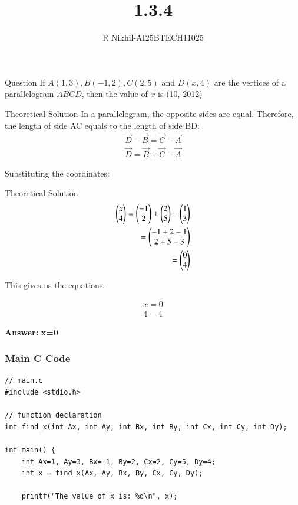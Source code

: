 \documentclass{beamer}
\title %
{1.3.4}
\author %
{R Nikhil-AI25BTECH11025}
\begin{document}
\frame{\titlepage}
\begin{frame}{Question}
If $ A(1, 3), B(-1, 2), C(2, 5) $ and $ D(x, 4) $ are the vertices of a parallelogram \( ABCD \), then the value of $x$ is \underline{\hspace{2cm}}(10, 2012)
\end{frame}

\begin{frame}{Theoretical Solution}
In a parallelogram, the opposite sides are equal. Therefore, the length of side AC equals to the length of side BD:
\begin{align}
\vec{D} - \vec{B} = \vec{C} - \vec{A} \\
\vec{D} = \vec{B} + \vec{C} - \vec{A}
\end{align}

Substituting the coordinates:
\end{frame}

\begin{frame}{Theoretical Solution}
\begin{align}
\begin{pmatrix} x \\ 4 \end{pmatrix} = \begin{pmatrix} -1 \\ 2 \end{pmatrix} + \begin{pmatrix} 2 \\ 5 \end{pmatrix} - \begin{pmatrix} 1 \\ 3 \end{pmatrix} \\
                 = \begin{pmatrix} -1 + 2 - 1 \\ 2 + 5 - 3 \end{pmatrix} \\
                 = \begin{pmatrix} 0 \\ 4 \end{pmatrix}
\end{align}

This gives us the equations: 

\begin{align}
    x=0  \\
    4=4
\end{align}

\textbf{Answer:}  
\textbf{x=0}
\end{frame}

\begin{frame}[fragile]
\frametitle{Main C Code}
   \begin{lstlisting}
// main.c
#include <stdio.h>

// function declaration
int find_x(int Ax, int Ay, int Bx, int By, int Cx, int Cy, int Dy);

int main() {
    int Ax=1, Ay=3, Bx=-1, By=2, Cx=2, Cy=5, Dy=4;
    int x = find_x(Ax, Ay, Bx, By, Cx, Cy, Dy);

    printf("The value of x is: %d\n", x);

\end{lstlisting}
	\end{frame}
\end{document}
